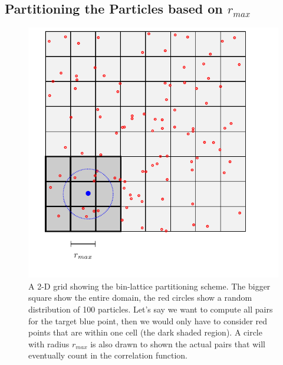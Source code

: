 \documentclass[12pt,titlepage,justified]{article}
\newcommand{\rmax}{\ensuremath{{r_{max}}}\xspace}
\begin{document}
\subsection{Partitioning the Particles based on \texorpdfstring{\rmax}{rmax}}
\begin{figure}
\centering
\includegraphics[width=\textwidth,clip=true]{tikz_grid}
\caption{A 2-D grid showing the bin-lattice partitioning scheme. The bigger square show the entire
domain, the red circles show a random distribution of 100 particles. Let's say we want to compute all pairs
for the target blue point, then we would only have to consider red points that are within one cell (the dark shaded region).
A circle with radius \rmax is also drawn to shown the actual pairs that will eventually count in the correlation function.}
\label{fig:grid}
\end{figure}
\end{document}

